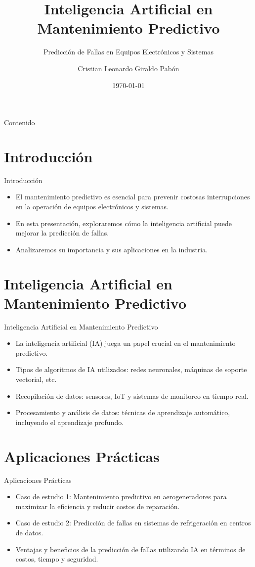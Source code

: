 \documentclass{beamer}
\title{Inteligencia Artificial en Mantenimiento Predictivo}
\subtitle{Predicción de Fallas en Equipos Electrónicos y Sistemas}
\author{Cristian Leonardo Giraldo Pabón}
\date{\today}
\begin{document}
\begin{frame}
  \titlepage
\end{frame}

\begin{frame}{Contenido}
  \tableofcontents
\end{frame}

\section{Introducción}
\begin{frame}{Introducción}
  \begin{itemize}
    \item El mantenimiento predictivo es esencial para prevenir costosas interrupciones en la operación de equipos electrónicos y sistemas.
    \item En esta presentación, exploraremos cómo la inteligencia artificial puede mejorar la predicción de fallas.
    \item Analizaremos su importancia y sus aplicaciones en la industria.
  \end{itemize}
\end{frame}

\section{Inteligencia Artificial en Mantenimiento Predictivo}
\begin{frame}{Inteligencia Artificial en Mantenimiento Predictivo}
  \begin{itemize}
    \item La inteligencia artificial (IA) juega un papel crucial en el mantenimiento predictivo.
    \item Tipos de algoritmos de IA utilizados: redes neuronales, máquinas de soporte vectorial, etc.
    \item Recopilación de datos: sensores, IoT y sistemas de monitoreo en tiempo real.
    \item Procesamiento y análisis de datos: técnicas de aprendizaje automático, incluyendo el aprendizaje profundo.
  \end{itemize}
\end{frame}

\section{Aplicaciones Prácticas}
\begin{frame}{Aplicaciones Prácticas}
  \begin{itemize}
    \item Caso de estudio 1: Mantenimiento predictivo en aerogeneradores para maximizar la eficiencia y reducir costos de reparación.
    \item Caso de estudio 2: Predicción de fallas en sistemas de refrigeración en centros de datos.
    \item Ventajas y beneficios de la predicción de fallas utilizando IA en términos de costos, tiempo y seguridad.
  \end{itemize}
\end{frame}
\end{document}
